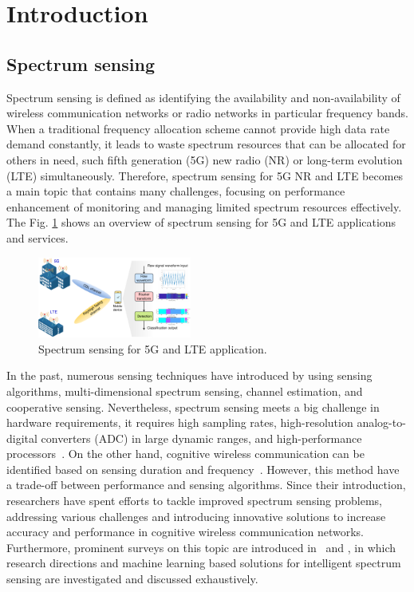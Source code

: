 \documentclass[journal]{IEEEtran} %
\begin{document}
\section{Introduction}
\subsection{Spectrum sensing}
Spectrum sensing is defined as identifying the availability and non-availability of wireless communication networks or radio networks in particular frequency bands. When a traditional frequency allocation scheme cannot provide high data rate demand constantly, it leads to waste spectrum resources that can be allocated for others in need, such fifth generation (5G) new radio (NR) or long-term evolution (LTE) simultaneously. Therefore, spectrum sensing for 5G NR and LTE becomes a main topic that contains many challenges, focusing on performance enhancement of monitoring and managing limited spectrum resources effectively. The Fig. \ref{fig1} shows an overview of spectrum sensing for 5G and LTE applications and services.

\begin{figure}[!ht]
    \centering
    \includegraphics[width=0.45\textwidth]{img/Design-Overview.pdf}
    \caption{Spectrum sensing for 5G and LTE application.}
    \label{fig1}
\end{figure}

In the past, numerous sensing techniques have introduced by using sensing algorithms, multi-dimensional spectrum sensing, channel estimation, and cooperative sensing. Nevertheless, spectrum sensing meets a big challenge in hardware requirements, it requires high sampling rates, high-resolution analog-to-digital converters (ADC) in large dynamic ranges, and high-performance processors~\cite{YucekSpectrumSensing}. On the other hand, cognitive wireless communication can be identified based on sensing duration and frequency~\cite{kumar2024analysis}. However, this method have a trade-off between performance and sensing algorithms. Since their introduction, researchers have spent efforts to tackle improved spectrum sensing problems, addressing various challenges and introducing innovative solutions to increase accuracy and performance in cognitive wireless communication networks. Furthermore, prominent surveys on this topic are introduced in~\cite{ali2016advances} and \cite{liyanaarachchi2021optimized}, in which research directions and machine learning based solutions for intelligent spectrum sensing are investigated and discussed exhaustively.
\end{document}
